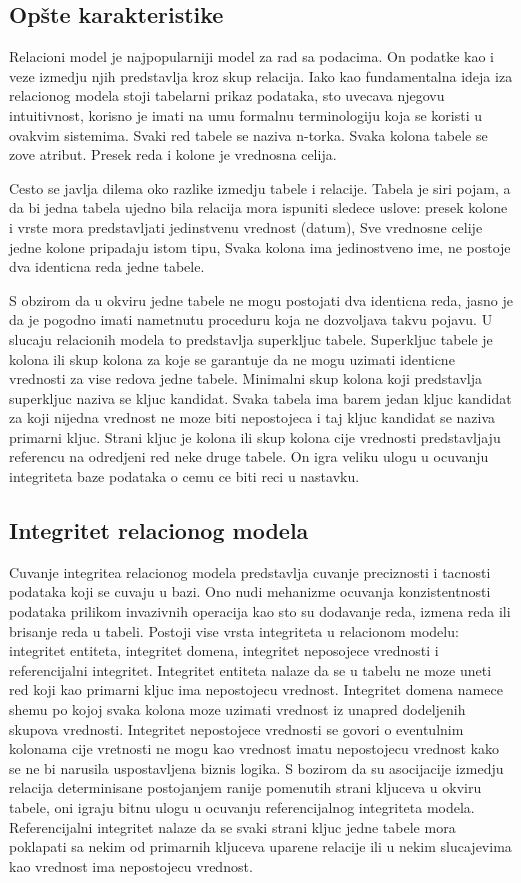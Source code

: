 \documentclass[12pt,oneside]{memoir}
\begin{document}
\subsection{Opšte karakteristike}
Relacioni model je najpopularniji model za rad sa podacima. On podatke kao i veze izmedju njih predstavlja kroz skup relacija. Iako kao fundamentalna ideja iza relacionog modela stoji tabelarni prikaz podataka, sto uvecava njegovu intuitivnost, korisno je imati na umu formalnu terminologiju koja se koristi u ovakvim sistemima. Svaki red tabele se naziva n-torka. Svaka kolona tabele se zove atribut. Presek reda i kolone je vrednosna celija.

Cesto se javlja dilema oko razlike izmedju tabele i relacije. Tabela je siri pojam, a da bi jedna tabela ujedno bila relacija mora ispuniti sledece uslove: presek kolone i vrste mora predstavljati jedinstvenu vrednost (datum), Sve vrednosne celije jedne kolone pripadaju istom tipu, Svaka kolona ima jedinostveno ime, ne postoje dva identicna reda jedne tabele.

S obzirom da u okviru jedne tabele ne mogu postojati dva identicna reda, jasno je da je pogodno imati nametnutu proceduru koja ne dozvoljava takvu pojavu. U slucaju relacionih modela to predstavlja superkljuc tabele. Superkljuc tabele je kolona ili skup kolona za koje se garantuje da ne mogu uzimati identicne vrednosti za vise redova jedne tabele. Minimalni skup kolona koji predstavlja superkljuc naziva se kljuc kandidat. Svaka tabela ima barem jedan kljuc kandidat za koji nijedna vrednost ne moze biti nepostojeca i taj kljuc kandidat se naziva primarni kljuc. Strani kljuc je kolona ili skup kolona cije vrednosti predstavljaju referencu na odredjeni red neke druge tabele. On igra veliku ulogu u ocuvanju integriteta baze podataka o cemu ce biti reci u nastavku.
\subsection{Integritet relacionog modela}
Cuvanje integritea relacionog modela predstavlja cuvanje preciznosti i tacnosti podataka koji se cuvaju u bazi. Ono nudi mehanizme ocuvanja konzistentnosti podataka prilikom invazivnih operacija kao sto su dodavanje reda, izmena reda ili brisanje reda u tabeli. Postoji vise vrsta integriteta u relacionom modelu: integritet entiteta, integritet domena, integritet neposojece vrednosti i referencijalni integritet.
Integritet entiteta nalaze da se u tabelu ne moze uneti red koji kao primarni kljuc ima nepostojecu vrednost. Integritet domena namece shemu po kojoj svaka kolona moze uzimati vrednost iz unapred dodeljenih skupova vrednosti. Integritet nepostojece vrednosti se govori o eventulnim kolonama cije vretnosti ne mogu kao vrednost imatu nepostojecu vrednost kako se ne bi narusila uspostavljena biznis logika. S bozirom da su asocijacije izmedju relacija determinisane postojanjem ranije pomenutih strani kljuceva u okviru tabele, oni igraju bitnu ulogu u ocuvanju referencijalnog integriteta modela. Referencijalni integritet nalaze da se svaki strani kljuc jedne tabele mora poklapati sa nekim od primarnih kljuceva uparene relacije ili u nekim slucajevima kao vrednost ima nepostojecu vrednost.
\end{document}
